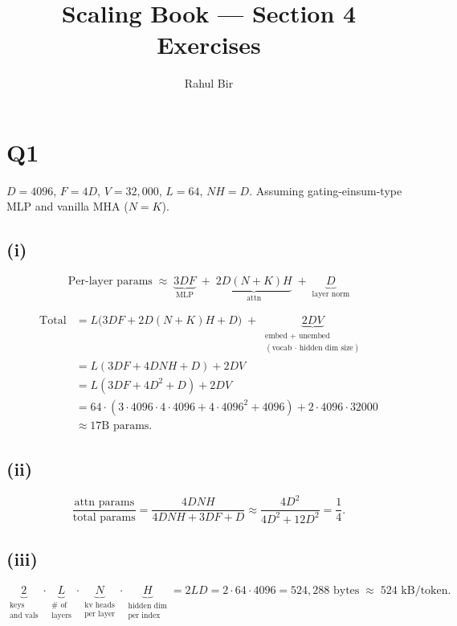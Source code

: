 \documentclass[11pt]{article}
\title{Scaling Book --- Section 4 Exercises}
\author{Rahul Bir}
\date{}
\begin{document}
\maketitle

\section*{Q1}

$D = 4096$, $F = 4D$, $V = 32{,}000$, $L = 64$, $NH = D$.
Assuming gating-einsum-type MLP and vanilla MHA ($N = K$).

\subsection*{(i)}

\[
\text{Per-layer params} \;\approx\; \underbrace{3DF}_{\text{MLP}} \;+\; \underbrace{2D(N+K)H}_{\text{attn}} \;+\; \underbrace{D}_{\text{layer norm}}
\]

\begin{align*}
\text{Total} &= L\big(3DF + 2D(N+K)H + D\big) \;+\; \underbrace{2DV}_{\substack{\text{embed + unembed} \\ (\text{vocab} \,\cdot\, \text{hidden dim size})}} \\
&= L(3DF + 4DNH + D) + 2DV \\
&= L(3DF + 4D^2 + D) + 2DV \\
&= 64 \cdot (3 \cdot 4096 \cdot 4 \cdot 4096 + 4 \cdot 4096^2 + 4096) + 2 \cdot 4096 \cdot 32000 \\
&\approx 17\text{B params.}
\end{align*}

\subsection*{(ii)}

\[
\frac{\text{attn params}}{\text{total params}}
= \frac{4DNH}{4DNH + 3DF + D}
\approx \frac{4D^2}{4D^2 + 12D^2}
= \frac{1}{4}.
\]

\subsection*{(iii)}

\[
\underbrace{2}_{\substack{\text{keys} \\ \text{and vals}}}
\cdot \underbrace{L}_{\substack{\#\text{ of} \\ \text{layers}}}
\cdot \underbrace{N}_{\substack{\text{kv heads} \\ \text{per layer}}}
\cdot \underbrace{H}_{\substack{\text{hidden dim} \\ \text{per index}}}
= 2LD
= 2 \cdot 64 \cdot 4096
= 524{,}288 \text{ bytes}
\;\approx\; 524 \text{ kB/token.}
\]
\end{document}
